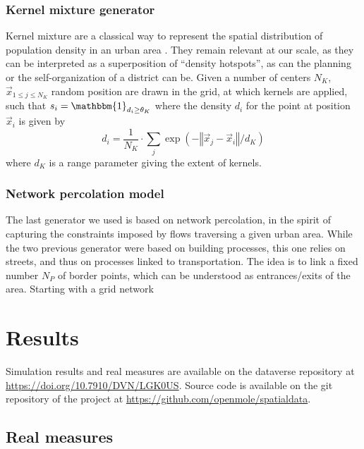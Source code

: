 \documentclass[letterpaper]{article}
\newcommand{\norm}[1]{\left\Vert #1\right\Vert}
\begin{document}
\subsubsection{Kernel mixture generator}

Kernel mixture are a classical way to represent the spatial distribution of population density in an urban area \citep{anas1998urban}. They remain relevant at our scale, as they can be interpreted as a superposition of ``density hotspots'', as can the planning or the self-organization of a district can be. Given a number of centers $N_K$, $\vec{x}_{1\leq j \leq N_K}$ random position are drawn in the grid, at which kernels are applied, such that $s_i = \mathbbm{1}_{d_i \geq \theta_K}$ where the density $d_i$ for the point at position $\vec{x}_i$ is given by
\begin{equation}
    d_i = \frac{1}{N_K}\cdot \sum_j \exp{\left(-\norm{\vec{x}_j - \vec{x}_i}/d_K\right)} 
\end{equation}
where $d_K$ is a range parameter giving the extent of kernels.

\subsubsection{Network percolation model}

The last generator we used is based on network percolation, in the spirit of capturing the constraints imposed by flows traversing a given urban area. While the two previous generator were based on building processes, this one relies on streets, and thus on processes linked to transportation. The idea is to link a fixed number $N_P$ of border points, which can be understood as entrances/exits of the area. Starting with a grid network 





\section{Results}

Simulation results and real measures are available on the dataverse repository at \url{https://doi.org/10.7910/DVN/LGK0US}. Source code is available on the git repository of the project at \url{https://github.com/openmole/spatialdata}.


\subsection{Real measures}
\end{document}
